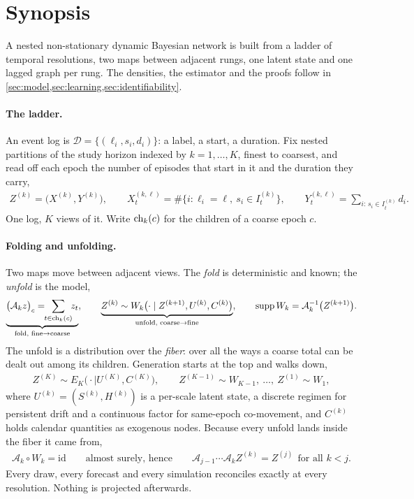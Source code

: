 \section{Synopsis}
\label{sec:synopsis}

A nested non-stationary dynamic Bayesian network is built from a ladder of
temporal resolutions, two maps between adjacent rungs, one latent state and one
lagged graph per rung. The densities, the estimator and the proofs follow in
\cref{sec:model,sec:learning,sec:identifiability}.

\paragraph{The ladder.}
An event log is \(\mathcal D=\{(\ell_i,s_i,d_i)\}\): a label, a start, a
duration. Fix nested partitions of the study horizon indexed by
\(k=1,\dots,K\), finest to coarsest, and read off each epoch the number of
episodes that start in it and the duration they carry,
\begin{align}
 Z^{(k)}=\bigl(X^{(k)},Y^{(k)}\bigr),
 \qquad
 X_t^{(k,\ell)}=\#\{i:\ell_i=\ell,\ s_i\in I_t^{(k)}\},
 \qquad
 Y_t^{(k,\ell)}=\!\!\sum_{i:\,s_i\in I_t^{(k)}}\!\! d_i .
 \label{eq:syn_project}
\end{align}
One log, \(K\) views of it. Write \(\operatorname{ch}_k(c)\) for the children of a
coarse epoch \(c\).

\paragraph{Folding and unfolding.}
Two maps move between adjacent views. The \emph{fold} is deterministic and
known; the \emph{unfold} is the model,
\begin{align}
 \underbrace{\bigl(\mathcal A_kz\bigr)_c=\!\!\sum_{t\in\operatorname{ch}_k(c)}\!\! z_t}_{\text{fold, fine}\to\text{coarse}},
 \qquad
 \underbrace{Z^{(k)}\sim W_k\bigl(\cdot\mid Z^{(k+1)},U^{(k)},C^{(k)}\bigr)}_{\text{unfold, coarse}\to\text{fine}},
 \qquad
 \operatorname{supp}W_k=\mathcal A_k^{-1}\bigl(Z^{(k+1)}\bigr).
 \label{eq:syn_foldunfold}
\end{align}
The unfold is a distribution over the \emph{fiber}: over all the ways a coarse
total can be dealt out among its children. Generation starts at the top and
walks down,
\begin{align}
 Z^{(K)}\sim E_K\bigl(\cdot\mid U^{(K)},C^{(K)}\bigr),
 \qquad
 Z^{(K-1)}\sim W_{K-1},\ \dots,\ Z^{(1)}\sim W_1 ,
 \label{eq:syn_generate}
\end{align}
where \(U^{(k)}=(S^{(k)},H^{(k)})\) is a per-scale latent state, a discrete
regimen for persistent drift and a continuous factor for same-epoch
co-movement, and \(C^{(k)}\) holds calendar quantities as exogenous nodes.
Because every unfold lands inside the fiber it came from,
\begin{align}
 \mathcal A_k\circ W_k=\mathrm{id}
 \qquad\text{almost surely, hence}\qquad
 \mathcal A_{j-1}\cdots\mathcal A_kZ^{(k)}=Z^{(j)}\ \ \text{for all }k<j .
 \label{eq:syn_coherence}
\end{align}
Every draw, every forecast and every simulation reconciles exactly at every
resolution. Nothing is projected afterwards.

